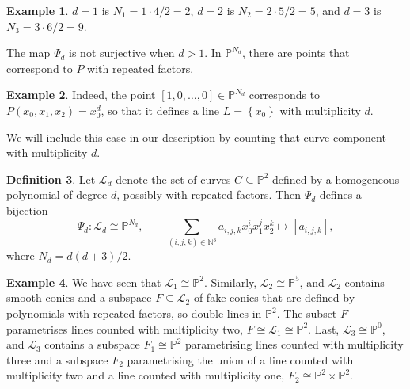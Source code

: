 \documentclass{article}
\newcommand{\N}{\mathbb{N}}
\renewcommand{\P}{\mathbb{P}}
\newcommand{\rb}[1]{\left( #1 \right)}
\renewcommand{\sb}[1]{\left[ #1 \right]}
\newcommand{\cb}[1]{\left\{ #1 \right\}}
\theoremstyle{definition}\newtheorem{definition}{Definition}[section]
\theoremstyle{definition}\newtheorem{notation}[definition]{Notation}
\theoremstyle{definition}\newtheorem{remark}[definition]{Remark}
\theoremstyle{definition}\newtheorem{example}[definition]{Example}
\theoremstyle{definition}\newtheorem{fact}{Fact}
\theoremstyle{definition}\newtheorem{exercise}{Exercise}
\begin{document}
\begin{example}
$ d = 1 $ is $ N_1 = 1 \cdot 4 / 2 = 2 $, $ d = 2 $ is $ N_2 = 2 \cdot 5 / 2 = 5 $, and $ d = 3 $ is $ N_3 = 3 \cdot 6 / 2 = 9 $.
\end{example}

The map $ \Psi_d $ is not surjective when $ d > 1 $. In $ \P^{N_d} $, there are points that correspond to $ P $ with repeated factors.

\begin{example}
Indeed, the point $ \sb{1, 0, \dots, 0} \in \P^{N_d} $ corresponds to $ P\rb{x_0, x_1, x_2} = x_0^d $, so that it defines a line $ L = \cb{x_0} $ with multiplicity $ d $.
\end{example}

We will include this case in our description by counting that curve component with multiplicity $ d $.

\begin{definition}
Let $ \mathcal{L}_d $ denote the set of curves $ C \subseteq \P^2 $ defined by a homogeneous polynomial of degree $ d $, possibly with repeated factors. Then $ \Psi_d $ defines a bijection
$$ \Psi_d : \mathcal{L}_d \cong \P^{N_d}, \qquad \sum_{\rb{i, j, k} \in \N^3} a_{i, j, k}x_0^ix_1^jx_2^k \mapsto \sb{a_{i, j, k}}, $$
where $ N_d = d\rb{d + 3} / 2 $.
\end{definition}

\begin{example}
We have seen that $ \mathcal{L}_1 \cong \P^2 $. Similarly, $ \mathcal{L}_2 \cong \P^5 $, and $ \mathcal{L}_2 $ contains smooth conics and a subspace $ F \subseteq \mathcal{L}_2 $ of fake conics that are defined by polynomials with repeated factors, so double lines in $ \P^2 $. The subset $ F $ parametrises lines counted with multiplicity two, $ F \cong \mathcal{L}_1 \cong \P^2 $. Last, $ \mathcal{L}_3 \cong \P^0 $, and $ \mathcal{L}_3 $ contains a subspace $ F_1 \cong \P^2 $ parametrising lines counted with multiplicity three and a subspace $ F_2 $ parametrising the union of a line counted with multiplicity two and a line counted with multiplicity one, $ F_2 \cong \P^2 \times \P^2 $.
\end{example}
\end{document}
